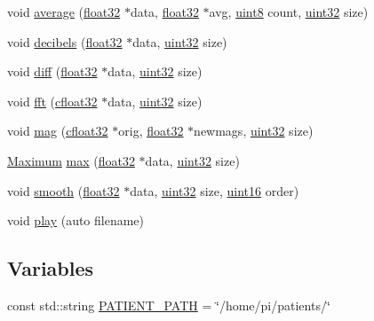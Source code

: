 \begin{DoxyCompactItemize}
void \hyperlink{namespacevaso_a9d0e5d69685ee494d286db6ece005156}{average} (\hyperlink{definitions_8hpp_aacdc525d6f7bddb3ae95d5c311bd06a1}{float32} $\ast$data, \hyperlink{definitions_8hpp_aacdc525d6f7bddb3ae95d5c311bd06a1}{float32} $\ast$avg, \hyperlink{definitions_8hpp_adde6aaee8457bee49c2a92621fe22b79}{uint8} count, \hyperlink{definitions_8hpp_a1134b580f8da4de94ca6b1de4d37975e}{uint32} size)
\item 
void \hyperlink{namespacevaso_af9bb2211cf3478333dfc1873bf316263}{decibels} (\hyperlink{definitions_8hpp_aacdc525d6f7bddb3ae95d5c311bd06a1}{float32} $\ast$data, \hyperlink{definitions_8hpp_a1134b580f8da4de94ca6b1de4d37975e}{uint32} size)
\item 
void \hyperlink{namespacevaso_a7d108bce812e906d8b1810815774c7ea}{diff} (\hyperlink{definitions_8hpp_aacdc525d6f7bddb3ae95d5c311bd06a1}{float32} $\ast$data, \hyperlink{definitions_8hpp_a1134b580f8da4de94ca6b1de4d37975e}{uint32} size)
\item 
void \hyperlink{namespacevaso_af74f08a8afd7967b6c2b3c2b0e5fb1e9}{fft} (\hyperlink{definitions_8hpp_a960be6b6614c08090c16574dba10a421}{cfloat32} $\ast$data, \hyperlink{definitions_8hpp_a1134b580f8da4de94ca6b1de4d37975e}{uint32} size)
\item 
void \hyperlink{namespacevaso_a5d355b5c326a852e2ce95c258450898c}{mag} (\hyperlink{definitions_8hpp_a960be6b6614c08090c16574dba10a421}{cfloat32} $\ast$orig, \hyperlink{definitions_8hpp_aacdc525d6f7bddb3ae95d5c311bd06a1}{float32} $\ast$newmags, \hyperlink{definitions_8hpp_a1134b580f8da4de94ca6b1de4d37975e}{uint32} size)
\item 
\hyperlink{structMaximum}{Maximum} \hyperlink{namespacevaso_a122846d728be312454a452d379915e10}{max} (\hyperlink{definitions_8hpp_aacdc525d6f7bddb3ae95d5c311bd06a1}{float32} $\ast$data, \hyperlink{definitions_8hpp_a1134b580f8da4de94ca6b1de4d37975e}{uint32} size)
\item 
void \hyperlink{namespacevaso_a5b7fc1a58199e2cac989f417a9faa1ce}{smooth} (\hyperlink{definitions_8hpp_aacdc525d6f7bddb3ae95d5c311bd06a1}{float32} $\ast$data, \hyperlink{definitions_8hpp_a1134b580f8da4de94ca6b1de4d37975e}{uint32} size, \hyperlink{definitions_8hpp_a05f6b0ae8f6a6e135b0e290c25fe0e4e}{uint16} order)
\item 
void \hyperlink{namespacevaso_a7da499b9b1b5a492bea8ab8681e57c22}{play} (auto filename)
\end{DoxyCompactItemize}
\subsection*{Variables}
\begin{DoxyCompactItemize}
\item 
const std\+::string \hyperlink{namespacevaso_a0f49c8240a13e7d853912ad78d5f53c9}{P\+A\+T\+I\+E\+N\+T\+\_\+\+P\+A\+T\+H} = \char`\"{}/home/pi/patients/\char`\"{}
\end{DoxyCompactItemize}


